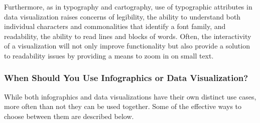 \documentclass[]{book}
\theoremstyle{definition}
\theoremstyle{definition}
\theoremstyle{definition}
\theoremstyle{remark}
\begin{document}
Furthermore, as in typography and cartography, use of typographic
attributes in data visualization raises concerns of legibility, the
ability to understand both individual characters and commonalities that
identify a font family, and readability, the ability to read lines and
blocks of words. Often, the interactivity of a visualization will not
only improve functionality but also provide a solution to readability
issues by providing a means to zoom in on small text.

\subsubsection{When Should You Use Infographics or Data
Visualization?}\label{when-should-you-use-infographics-or-data-visualization-1}

While both infographics and data visualizations have their own distinct
use cases, more often than not they can be used together. Some of the
effective ways to choose between them are described below.
\end{document}
